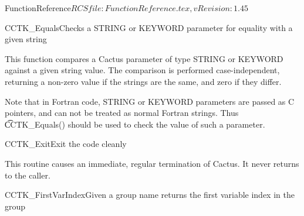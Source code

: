 \begin{cactuspart}{5}{FunctionReference}{$RCSfile: FunctionReference.tex,v $}{$Revision: 1.45 $}
\begin{CCTKFunc}{CCTK\_Equals}{Checks a STRING or KEYWORD parameter for equality with a given string}
\label{CCTK-Equals}
\showargs
\begin{params}
\end{params}
\begin{discussion}
This function compares a Cactus parameter of type STRING or KEYWORD against a
given string value. The comparison is performed case-independent,
returning a non-zero value if the strings are the same, and zero if they differ.

Note that in Fortran code, STRING or KEYWORD parameters are passed as C pointers,
and can not be treated as normal Fortran strings. Thus {\t CCTK\_Equals()}
should be used to check the value of such a parameter.
\end{discussion}
\end{CCTKFunc}

\begin{CCTKFunc}{CCTK\_Exit}{Exit the code cleanly}
\label{CCTK-Exit}
\showargs
\begin{params}
\end{params}
\begin{discussion}
This routine causes an immediate, regular termination of Cactus.
It never returns to the caller.
\end{discussion}
\end{CCTKFunc}






\begin{CCTKFunc}{CCTK\_FirstVarIndex}{Given a group name returns the first variable index in the group}
\label{CCTK-FirstVarIndex}
\showargs
\begin{params}
\end{params}
\begin{discussion}


\end{discussion}
\end{CCTKFunc}
\end{cactuspart}
